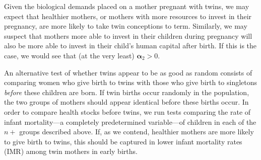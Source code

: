 Given the biological demands placed on a mother pregnant with twins, we may 
expect that healthier mothers, or mothers with more resources to invest in their
pregnancy, are more likely to take twin conceptions to term.  Similarly, we may
suspect that mothers more able to invest in their children during pregnancy will 
also be more able to invest in their child's human capital after birth.  If this 
is the case, we would see that (at the very least) $\bm{\alpha}_2>0$.  

An alternative test of whether twins appear to be as good as random consists of 
comparing women who give birth to twins with those who give birth to singletons 
\emph{before} these children are born.  If twin births occur randomly in the 
population, the two groups of mothers should appear identical before these births 
occur. In order to compare health stocks before twins, we run tests comparing the 
rate of infant mortality---a completely predetermined variable---of children in 
each of the $n+$ groups described above.  If, as we contend, healthier mothers 
are more likely to give birth to twins, this should be captured in lower infant 
mortality rates (IMR) among twin mothers in early births.

